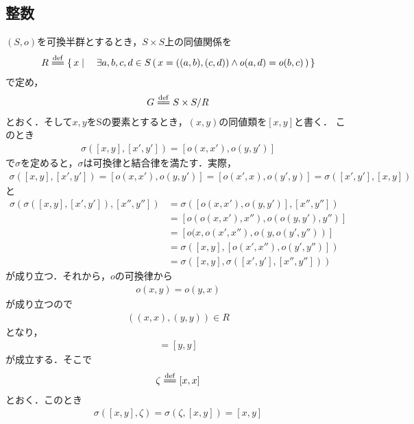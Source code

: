 \subsection{整数}
	$(S,o)$を可換半群とするとき，$S \times S$上の同値関係を
	\begin{align}
		R \defeq \Set{x}{\exists a,b,c,d \in S\, (\, x=((a,b),(c,d))
		\wedge o(a,d) = o(b,c)\, )}
	\end{align}
	で定め，
	\begin{align}
		G \defeq S \times S / R
	\end{align}
	とおく．そして$x,y$をSの要素とするとき，$(x,y)$の同値類を$[x,y]$と書く．
	このとき
	\begin{align}
		\sigma \left([x,y],[x',y'] \right) = \left[o(x,x'),o(y,y')\right]
	\end{align}
	で$\sigma$を定めると，$\sigma$は可換律と結合律を満たす．実際，
	\begin{align}
		\sigma \left( [x,y],[x',y'] \right)
		= \left[ o(x,x'), o(y,y') \right]
		= \left[ o(x',x), o(y',y) \right]
		= \sigma \left( [x',y'],[x,y] \right)
	\end{align}
	と
	\begin{align}
		\sigma \left(\sigma \left([x,y],[x',y']\right),[x'',y''] \right)
		&= \sigma \left(\left[ o(x,x'),o(y,y') \right],[x'',y''] \right) \\
		&= \left[ o(o(x,x'),x''), o(o(y,y'),y'') \right] \\
		&= \left[ o(x,o(x',x''), o(y,o(y',y'')) \right] \\
		&= \sigma \left( [x,y], \left[ o(x',x''),o(y',y'') \right] \right) \\
		&= \sigma \left( [x,y], \sigma \left([x',y'],[x'',y'']\right) \right)
	\end{align}
	が成り立つ．それから，$o$の可換律から
	\begin{align}
		o(x,y) = o(y,x)
	\end{align}
	が成り立つので
	\begin{align}
		((x,x),(y,y)) \in R
	\end{align}
	となり，
	\begin{align}
		[x,x] = [y,y]
	\end{align}
	が成立する．そこで
	\begin{align}
		\zeta \defeq [x,x]
	\end{align}
	とおく．このとき
	\begin{align}
		\sigma \left( [x,y],\zeta \right)
		= \sigma \left( \zeta,[x,y] \right)
		= [x,y]
	\end{align}
